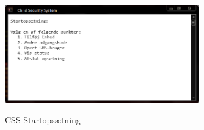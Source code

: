 \begin{figure}[h] \centering
{\includegraphics[width=0.75\textwidth]{billeder/cmdprompt/CSS_startopsaetning}}
\caption{CSS Startopsætning}
\end{figure}

